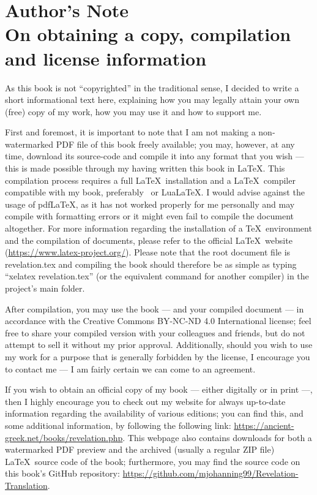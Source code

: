 \chapter*{Author's Note  \\ \large On obtaining a copy, compilation and license information}

As this book is not “copyrighted” in the traditional sense, I decided to write a short informational text here, explaining how you may legally attain your own (free) copy of my work, how you may use it and how to support me. 

First and foremost, it is important to note that I am not making a non-watermarked PDF file of this book freely available; you may, however, at any time, download its source-code and compile it into any format that you wish — this is made possible through my having written this book in \LaTeX. This compilation process requires a full \LaTeX\ installation and a \LaTeX\ compiler compatible with my book, preferably \XeLaTeX\ or Lua\LaTeX. I would advise against the usage of pdf\LaTeX, as it has not worked properly for me personally and may compile with formatting errors or it might even fail to compile the document altogether. For more information regarding the installation of a \TeX\ environment and the compilation of documents, please refer to the official \LaTeX\ website (\url{https://www.latex-project.org/}). Please note that the root document file is revelation.tex and compiling the book should therefore be as simple as typing “xelatex revelation.tex” (or the equivalent command for another compiler) in the project's main folder. 

After compilation, you may use the book — and your compiled document — in accordance with the Creative Commons BY-NC-ND 4.0 International license; feel free to share your compiled version with your colleagues and friends, but do not attempt to sell it without my prior approval. Additionally, should you wish to use my work for a purpose that is generally forbidden by the license, I encourage you to contact me — I am fairly certain we can come to an agreement.

If you wish to obtain an official copy of my book — either digitally or in print —, then I highly encourage you to check out my website for always up-to-date information regarding the availability of various editions; you can find this, and some additional information, by following the following link: \url{https://ancient-greek.net/books/revelation.php}. This webpage also contains downloads for both a watermarked PDF preview and the archived (usually a regular ZIP file) \LaTeX\ source code of the book; furthermore, you may find the source code on this book’s GitHub repository: \url{https://github.com/mjohanning99/Revelation-Translation}.